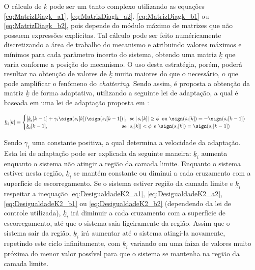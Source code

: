 \documentclass[]{politex}
\begin{document}
O cálculo de $\underline{k}$ pode ser um tanto complexo utilizando as equações \eqref{eq:MatrizDiagk_a1}, \eqref{eq:MatrizDiagk_a2}, \eqref{eq:MatrizDiagk_b1} ou \eqref{eq:MatrizDiagk_b2}, pois depende do módulo máximo de matrizes que não possuem expressões explícitas. Tal cálculo pode ser feito numéricamente discretizando a área de trabalho do mecanismo e atribuindo valores máximos e mínimos para cada parâmetro incerto do sistema, obtendo uma matriz $\underline{k}$ que varia conforme a posição do mecanismo. O uso desta estratégia, porém, poderá resultar na obtenção de valores de $\underline{k}$ muito maiores do que o necessário, o que pode amplificar o fenômeno do \emph{chattering}. Sendo assim, é proposta a obtenção da matriz $\underline{k}$ de forma adaptativa, utilizando a seguinte lei de adaptação, a qual é baseada em uma lei de adaptação proposta em \cite{Monsees}:

\begin{equation}
\underline{k}_i[k] = \begin{cases}
\big| \underline{k}_i[k-1] + \gamma_i \sign(s_i [k]) \sign(s_i [k-1])  \big|, \, \text{ se } |s_i[k]| \geq \phi \, \text{ ou }  \sign(s_i [k]) = - \sign(s_i [k-1]) \\
\underline{k}_i[k-1], \;\;\;\;\;\;\;\;\;\;\;\;\;\;\;\;\;\;\;\;\;\;\;\;\;\;\;\;\;\;\;\;\;\;\;\;\;\;\;\;\;\;\;\;\;\;\;\;\;\, \text{ se } |s_i[k]| < \phi \, \text{ e }  \sign(s_i [k]) = \sign(s_i [k-1]) \\
 
\end{cases}
\end{equation}

Sendo $\gamma_i$ uma constante positiva, a qual determina a velocidade da adaptação. \\

Esta lei de adaptação pode ser explicada da seguinte maneira: $\underline{k}_i$ aumenta enquanto o sistema não atingir a região da camada limite. Enquanto o sistema estiver nesta região, $\underline{k}_i$ se mantém constante ou diminui a cada cruzamento com a superfície de escorregamento. Se o sistema estiver região da camada limite e $\underline{k}_i$ respeitar a inequação \eqref{eq:DesigualdadeK2_a1}, \eqref{eq:DesigualdadeK2_a2}, \eqref{eq:DesigualdadeK2_b1} ou \eqref{eq:DesigualdadeK2_b2} (dependendo da lei de controle utilizada), $\underline{k}_i$ irá diminuir a cada cruzamento com a superfície de escorregamento, até que o sistema saia ligeiramente da região. Assim que o sistema sair da região, $\underline{k}_i$ irá aumentar até o sistema atingi-la novamente, repetindo este ciclo infinitamente, com $\underline{k}_i$ variando em uma faixa de valores muito próxima do menor valor possível para que o sistema se mantenha na região da camada limite.
\end{document}
